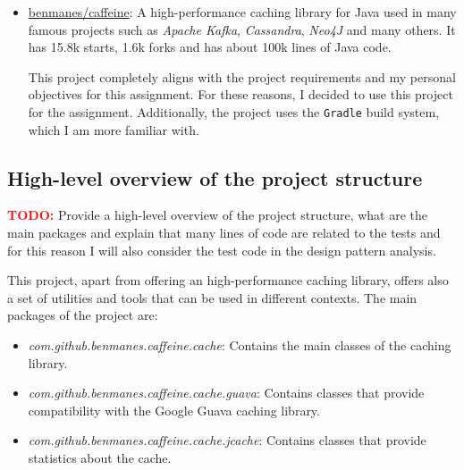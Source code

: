 \documentclass[a4paper, 11pt]{article}
\begin{document}
\begin{itemize}
\begin{lstlisting}[language=bash, caption={Error during compilation of RxJava project}, breaklines=true, captionpos=b]
* What went wrong:
Could not open settings generic class cache for settings file '/Users/lucadibello/Developer/RxJava/settings.gradle' (/Users/lucadibello/.gradle/caches/7.6.4/scripts/7qrwiegia3vs821g20py0pu68).
> BUG! exception in phase 'semantic analysis' in source unit '\_BuildScript\_' Unsupported class file major version 67
        \end{lstlisting}

	\item \href{}{benmanes/caffeine}: A high-performance caching library for Java used in many famous projects such as \textit{Apache Kafka}, \textit{Cassandra}, \textit{Neo4J} and many others. It has 15.8k starts, 1.6k forks and has about 100k lines of Java code.

	      This project completely aligns with the project requirements and my personal objectives for this assignment. For these reasons, I decided to use this project for the assignment. Additionally, the project uses the \texttt{Gradle} build system, which I am more familiar with.

\end{itemize}

\subsection{High-level overview of the project structure}

\textcolor{red}{\textbf{TODO:}} Provide a high-level overview of the project structure, what are the main packages and explain that many lines of code are related to the tests and for this reason I will also consider the test code in the design pattern analysis.

This project, apart from offering an high-performance caching library, offers also a set of utilities and tools that can be used in different contexts. The main packages of the project are:

\begin{itemize}
	\item \textit{com.github.benmanes.caffeine.cache}: Contains the main classes of the caching library.
	\item \textit{com.github.benmanes.caffeine.cache.guava}: Contains classes that provide compatibility with the Google Guava caching library.
	\item \textit{com.github.benmanes.caffeine.cache.jcache}: Contains classes that provide statistics about the cache.

\end{itemize}
\end{document}
